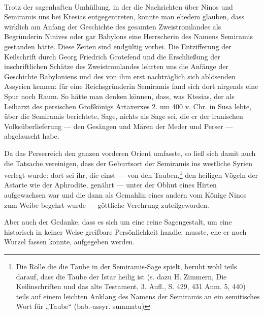 \documentclass[a4paper, 11pt, oneside, polutonikogreek, german]{article}
\begin{document}
\paragraph{}
Trotz der sagenhaften Umhüllung, in der die Nachrichten über Ninos und Semiramis uns bei Ktesias entgegentreten, konnte man ehedem glauben, dass wirklich am Anfang der Geschichte des gesamten Zweistromlandes als Begründerin Ninives oder gar Babylons eine Herrscherin des Namens Semiramis gestanden hätte. Diese Zeiten sind endgültig vorbei. Die Entzifferung der Keilschrift durch Georg Friedrich Grotefend und die Erschließung der inschriftlichen Schätze des Zweistromlandes lehrten uns die Anfänge der Geschichte Babyloniens und des von ihm erst nachträglich sich ablösenden Assyrien kennen: für eine Reichsgründerin Semiramis fand sich dort nirgends eine Spur noch Raum. So hätte man denken können, dass, was Ktesias, der als Leibarzt des persischen Großkönigs Artaxerxes 2. um 400 v. Chr. in Susa lebte, über die Semiramis berichtete, Sage, nichts als Sage sei, die er der iranischen Volksüberlieferung --- den Gesängen und Mären der Meder und Perser --- abgelauscht habe.

Da das Perserreich den ganzen vorderen Orient umfasste, so ließ sich damit auch die Tatsache vereinigen, dass der Geburtsort der Semiramis ins westliche Syrien verlegt wurde: dort sei ihr, die einst --- von den Tauben,\footnote{Die Rolle die die Taube in der Semiramis-Sage spielt, beruht wohl teils darauf, dass die Taube der Istar heilig ist (s. dazu H. Zimmern, Die Keilinschriften und das alte Testament, 3. Aufl., S. 429, 431 Anm. 5, 440) teils auf einem leichten Anklang des Namens der Semiramis an ein semitisches Wort für „Taube“ (bab.-assyr. summatu)} den heiligen Vögeln der Astarte wie der Aphrodite, genährt --- unter der Obhut eines Hirten aufgewachsen war und die dann als Gemahlin eines andern vom Könige Ninos zum Weibe begehrt wurde --- göttliche Verehrung zuteilgeworden.

Aber auch der Gedanke, dass es sich um eine reine Sagengestalt, um eine historisch in keiner Weise greifbare Persönlichkeit handle, musste, ehe er noch Wurzel fassen konnte, aufgegeben werden.
\end{document}
